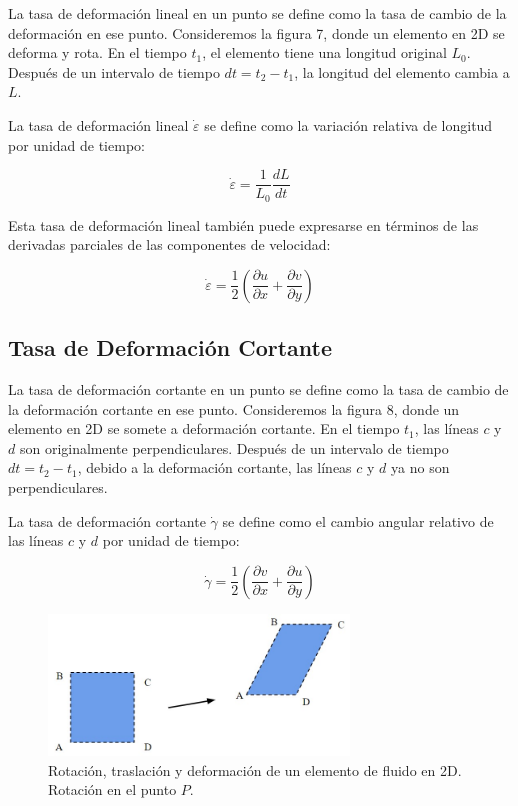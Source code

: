 \documentclass[10pt, oneside]{article}
\begin{document}
La tasa de deformación lineal en un punto se define como la tasa de cambio de la deformación en ese punto. Consideremos la figura 7, donde un elemento en 2D se deforma y rota. En el tiempo $t_1$, el elemento tiene una longitud original $L_0$. Después de un intervalo de tiempo $dt=t_2 - t_1$, la longitud del elemento cambia a $L$.

La tasa de deformación lineal $\dot{\varepsilon}$ se define como la variación relativa de longitud por unidad de tiempo:

\[
\dot{\varepsilon} = \frac{1}{L_0} \frac{dL}{dt}
\]

Esta tasa de deformación lineal también puede expresarse en términos de las derivadas parciales de las componentes de velocidad:

\[
\dot{\varepsilon} = \frac{1}{2} \left( \frac{\partial u}{\partial x} + \frac{\partial v}{\partial y} \right)
\]

\subsection{Tasa de Deformación Cortante}

La tasa de deformación cortante en un punto se define como la tasa de cambio de la deformación cortante en ese punto. Consideremos la figura 8, donde un elemento en 2D se somete a deformación cortante. En el tiempo $t_1$, las líneas $c$ y $d$ son originalmente perpendiculares. Después de un intervalo de tiempo $dt=t_2 - t_1$, debido a la deformación cortante, las líneas $c$ y $d$ ya no son perpendiculares.

La tasa de deformación cortante $\dot{\gamma}$ se define como el cambio angular relativo de las líneas $c$ y $d$ por unidad de tiempo:

\[
\dot{\gamma} = \frac{1}{2} \left( \frac{\partial v}{\partial x} + \frac{\partial u}{\partial y} \right)
\]



\begin{figure}[h]
\centering
\includegraphics[width=8cm]{Fig.11.jpg}
\caption{Rotación, traslación y deformación de un elemento de fluido en 2D.  Rotación en el punto $P$.}
\label{rotat}
\end{figure}
\end{document}
